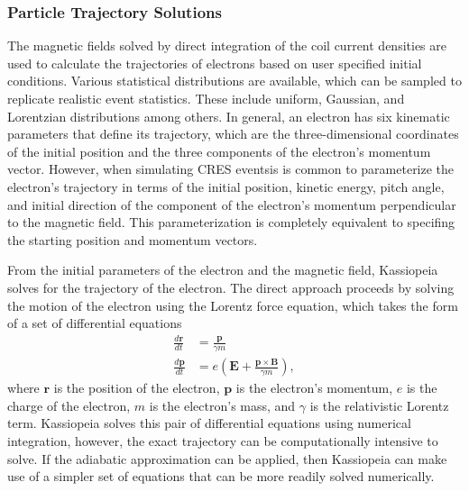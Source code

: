 \subsubsection*{Particle Trajectory Solutions}

The magnetic fields solved by direct integration of the coil current densities are used to calculate the trajectories of electrons based on user specified initial conditions. Various statistical distributions are available, which can be sampled to replicate realistic event statistics. These include uniform, Gaussian, and Lorentzian distributions among others. In general, an electron has six kinematic parameters that define its trajectory, which are the three-dimensional coordinates of the initial position and the three components of the electron's momentum vector. However, when simulating CRES eventsis is common to parameterize the electron's trajectory in terms of the initial position, kinetic energy, pitch angle, and initial direction of the component of the electron's momentum perpendicular to the magnetic field. This parameterization is completely equivalent to specifing the starting position and momentum vectors. 

From the initial parameters of the electron and the magnetic field, Kassiopeia solves for the trajectory of the electron. The direct approach proceeds by solving the motion of the electron using the Lorentz force equation, which takes the form of a set of differential equations 
\begin{align}
    \frac{d\mathbf{r}}{dt}&=\frac{\mathbf{p}}{\gamma m}\\
    \frac{d\mathbf{p}}{dt}&=e(\mathbf{E}+\frac{\mathbf{p}\times\mathbf{B}}{\gamma m}),
\end{align}
where $\mathbf{r}$ is the position of the electron, $\mathbf{p}$ is the electron's momentum, $e$ is the charge of the electron, $m$ is the electron's mass, and $\gamma$ is the relativistic Lorentz term.%
Kassiopeia solves this pair of differential equations using numerical integration, however, the exact trajectory can be computationally intensive to solve. If the adiabatic approximation can be applied, then Kassiopeia can make use of a simpler set of equations that can be more readily solved numerically. 

